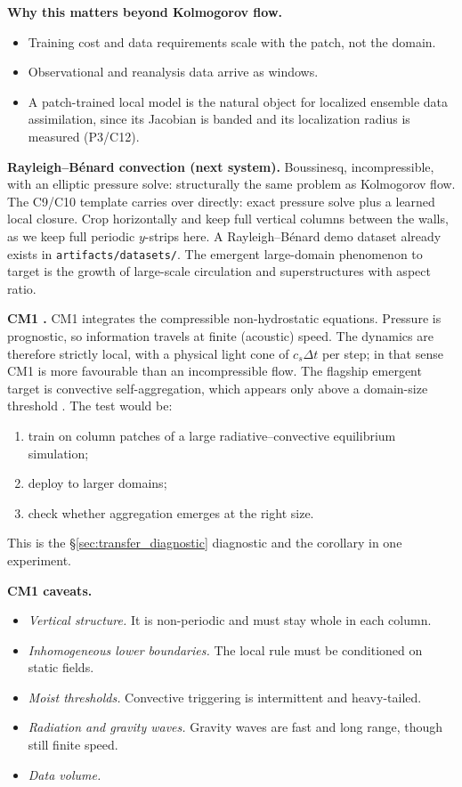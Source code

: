 \documentclass[11pt]{article}
\begin{document}
\textbf{Why this matters beyond Kolmogorov flow.}
\begin{itemize}[leftmargin=*]
\item Training cost and data requirements scale with the patch, not the
  domain.
\item Observational and reanalysis data arrive as windows.
\item A patch-trained local model is the natural object for localized
  ensemble data assimilation, since its Jacobian is banded and its
  localization radius is measured (P3/C12).
\end{itemize}

\textbf{Rayleigh--B\'enard convection (next system).} Boussinesq,
incompressible, with an elliptic pressure solve: structurally the same
problem as Kolmogorov flow. The C9/C10 template carries over directly:
exact pressure solve plus a learned local closure. Crop horizontally and
keep full vertical columns between the walls, as we keep full periodic
$y$-strips here. A Rayleigh--B\'enard demo dataset already exists in
\texttt{artifacts/datasets/}. The emergent large-domain phenomenon to
target is the growth of large-scale circulation and superstructures with
aspect ratio.

\textbf{CM1 \cite{bryanfritsch2002}.} CM1 integrates the compressible
non-hydrostatic equations. Pressure is prognostic, so information
travels at finite (acoustic) speed. The dynamics are therefore strictly
local, with a physical light cone of $c_s\Delta t$ per step; in that
sense CM1 is more favourable than an incompressible flow. The flagship
emergent target is convective self-aggregation, which appears only above
a domain-size threshold \cite{mullerheld2012,jeevanjeeromps2013}. The
test would be:
\begin{enumerate}[leftmargin=*]
\item train on column patches of a large radiative--convective
  equilibrium simulation;
\item deploy to larger domains;
\item check whether aggregation emerges at the right size.
\end{enumerate}
This is the \S\ref{sec:transfer_diagnostic} diagnostic and the corollary
in one experiment.

\textbf{CM1 caveats.}
\begin{itemize}[leftmargin=*]
\item \emph{Vertical structure.} It is non-periodic and must stay whole
  in each column.
\item \emph{Inhomogeneous lower boundaries.} The local rule must be
  conditioned on static fields.
\item \emph{Moist thresholds.} Convective triggering is intermittent and
  heavy-tailed.
\item \emph{Radiation and gravity waves.} Gravity waves are fast and long
  range, though still finite speed.
\item \emph{Data volume.}
\end{itemize}
\end{document}
